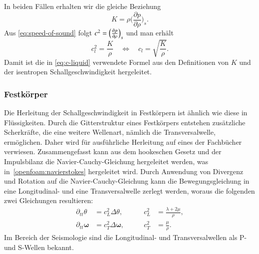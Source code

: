 In beiden Fällen erhalten wir die gleiche Beziehung
\begin{equation*}
    K = \rho\biggl(\frac{\partial p}{\partial \rho}\biggr)_{s}.
\end{equation*}
Aus \eqref{eq:speed-of-sound} folgt
$c^2=\Bigl(\frac{\partial p}{\partial \rho}\Bigr)_s$
und man erhält
\begin{equation*}
    c_l^2 = \frac{K}{\rho} \quad \Leftrightarrow \quad c_l=\sqrt{\frac{K}{\rho}}.
\end{equation*}
Damit ist die in \eqref{eq:c-liquid} verwendete Formel aus den Definitionen von $K$
und der isentropen Schallgeschwindigkeit hergeleitet.

\subsubsection{Festkörper}
Die Herleitung der Schallgeschwindigkeit in Festkörpern ist ähnlich wie diese
in Flüssigkeiten. Durch die Gitterstruktur eines Festkörpers entstehen
zusätzliche Scherkräfte, die eine weitere Wellenart, nämlich die
Transversalwelle, ermöglichen. Daher wird für ausführliche Herleitung
auf eines der Fachbücher \cite{schall:landaulifschitz,schall:gurtin}
verwiesen.
Zusammengefasst kann aus dem hookeschen Gesetz und der Impulsbilanz
die Navier-Cauchy-Gleichung hergeleitet werden, was in~\ref{openfoam:navierstokes}
%
hergeleitet wird.
Durch Anwendung von Divergenz und Rotation auf die Navier-Cauchy-Gleichung
kann die Bewegungsgleichung in eine Longitudinal- und eine Transversalwelle
zerlegt werden, woraus die folgenden zwei Gleichungen resultieren:
\[
\begin{aligned}
    \partial_{tt}\theta &= c_L^2\Delta\theta, & \qquad c_L^2 &= \frac{\lambda+2\mu}{\rho} ,\\
    \partial_{tt}\boldsymbol{\omega} &= c_T^2\Delta\boldsymbol{\omega}, & \qquad c_T^2 &= \frac{\mu}{\rho} .
\end{aligned}
\]
Im Bereich der Seismologie sind die Longitudinal- und Transversalwellen als
P- und S-Wellen bekannt.

